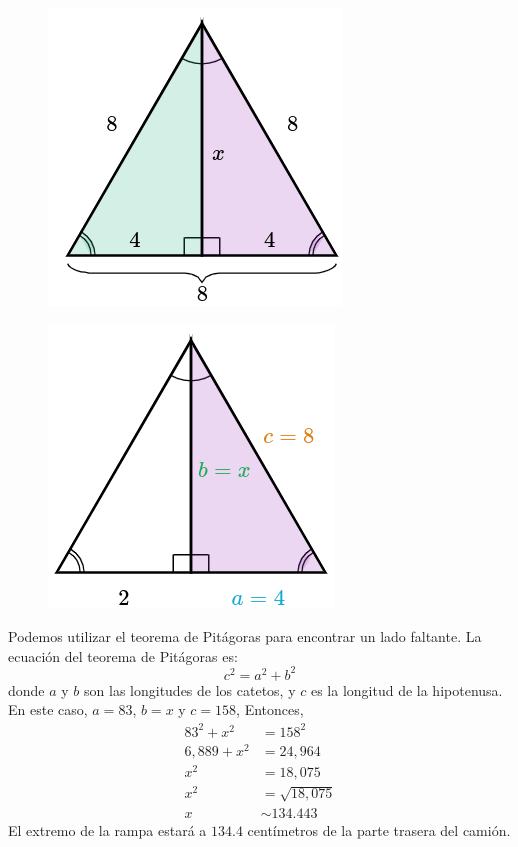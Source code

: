 \begin{solutionbox}{15cm}
    \begin{minipage}{0.3\textwidth}
        \begin{figure}[H]
            \centering
            \includegraphics[width=0.6\linewidth]{../images/pitagoras12a.png}
            \caption{}
            \label{fig:pitagoras12a}
        \end{figure}
        \begin{figure}[H]
            \centering
            \includegraphics[width=0.6\linewidth]{../images/pitagoras12b.png}
            \caption{}
            \label{fig:pitagoras12b}
        \end{figure}
    \end{minipage}\hfill
    \begin{minipage}{0.65\textwidth}
        Podemos utilizar el teorema de Pitágoras para encontrar un lado faltante.
        La ecuación del teorema de Pitágoras es:
        \[c^2=a^2+b^2\]
        donde $a$ y $b$ son las longitudes de los catetos, y $c$ es la longitud de la hipotenusa.
        En este caso, $a=83$, $b=x$ y $c=158$, Entonces,
        \begin{align*}
            83^2+x^2  & =158^2         \\
            6,889+x^2 & =24,964        \\
            x^2       & =18,075        \\
            x^2       & =\sqrt{18,075} \\
            x         & \sim 134.443
        \end{align*}
        El extremo de la rampa estará a $134.4$ centímetros de la parte trasera del camión.
    \end{minipage}
\end{solutionbox}
